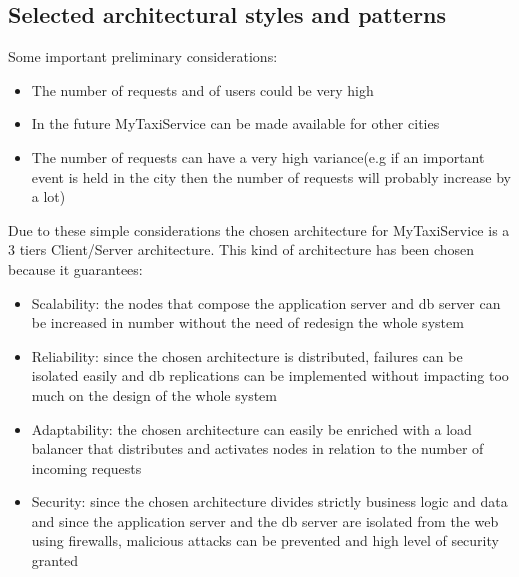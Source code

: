 \documentclass[11pt,titlepage]{article} %
\begin{document}
\subsection{Selected architectural styles and patterns}
        Some important preliminary considerations:
        \begin{itemize}
	        \item The number of requests and of users could be very high
	        \item In the future MyTaxiService can be made available for other cities
	        \item The number of requests can have a very high variance(e.g if an important event is held in the city then the number
	        of requests will probably increase by a lot)
         \end{itemize}

        Due to these simple considerations the chosen architecture for MyTaxiService is a 3 tiers Client/Server architecture.
        This kind of architecture has been chosen because it guarantees:
        \begin{itemize}
	        \item Scalability: the nodes that compose the application server and db server can be increased in number without the need
	        of redesign the whole system
	        \item Reliability: since the chosen architecture is distributed, failures can be isolated easily and db replications can be
	        implemented without impacting too much on the design of the whole system
	        \item Adaptability: the chosen architecture can easily be enriched with a load balancer that distributes and activates nodes
	        in relation to the number of incoming requests
	        \item Security: since the chosen architecture divides strictly business logic and data and since the application server
	        and the db server are isolated from the web using firewalls, malicious attacks can be prevented and high level of
	        security granted
	\end{itemize}
\end{document}
